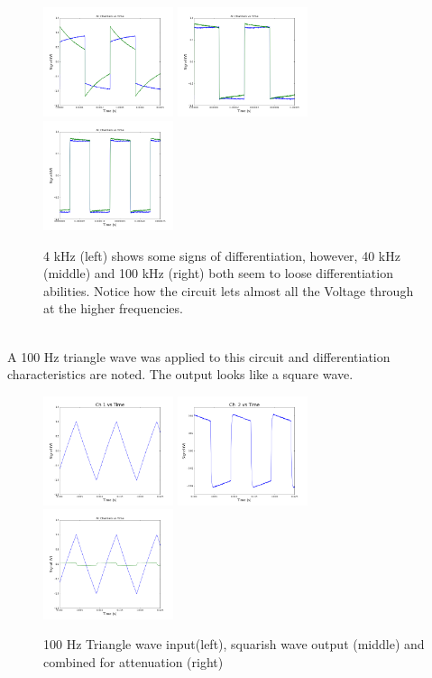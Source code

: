 \documentclass[a4paper,12pt]{article}
\begin{document}
\begin{figure}[h]
\centering
\includegraphics[width=1.5in]{sam_lab2/4b_4kHz.png}
\includegraphics[width=1.5in]{sam_lab2/4b_40kHz.png}
\includegraphics[width=1.5in]{sam_lab2/4b_100kHz.png}
\caption{4 kHz (left) shows some signs of differentiation, however, 40 kHz (middle) and 100 kHz (right) both seem to loose differentiation abilities.  Notice how the circuit lets almost all the Voltage through at the higher frequencies.}
\end{figure}\\
\newpage
A 100 Hz triangle wave was applied to this circuit and differentiation characteristics are noted.  The output looks like a square wave.
\begin{figure}[h]
\centering
\includegraphics[width=1.5in]{sam_lab2/4c_input.png}
\includegraphics[width=1.5in]{sam_lab2/4c_output.png}
\includegraphics[width=1.5in]{sam_lab2/4c_combined.png}
\caption{100 Hz Triangle wave input(left), squarish wave output (middle) and combined for attenuation (right)}
\end{figure}\\
\end{document}
